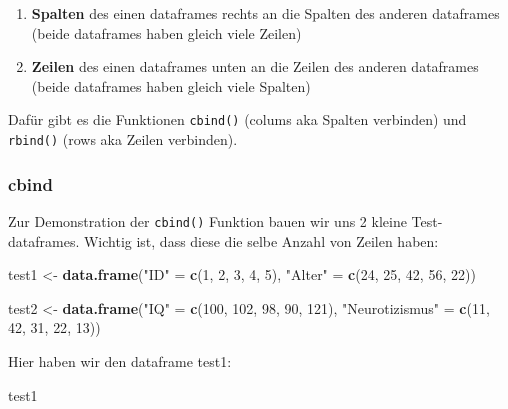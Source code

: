 \documentclass[
]{book}
\newenvironment{Shaded}{\begin{snugshade}}{\end{snugshade}}
\newcommand{\DecValTok}[1]{\textcolor[rgb]{0.00,0.00,0.81}{#1}}
\newcommand{\FunctionTok}[1]{\textcolor[rgb]{0.13,0.29,0.53}{\textbf{#1}}}
\newcommand{\NormalTok}[1]{#1}
\newcommand{\OtherTok}[1]{\textcolor[rgb]{0.56,0.35,0.01}{#1}}
\newcommand{\StringTok}[1]{\textcolor[rgb]{0.31,0.60,0.02}{#1}}
\providecommand{\tightlist}{%
  \setlength{\itemsep}{0pt}\setlength{\parskip}{0pt}}
\begin{document}
\begin{enumerate}
\def\labelenumi{\arabic{enumi}.}
\tightlist
\item
  \textbf{Spalten} des einen dataframes rechts an die Spalten des anderen dataframes (beide dataframes haben gleich viele Zeilen)
\item
  \textbf{Zeilen} des einen dataframes unten an die Zeilen des anderen dataframes (beide dataframes haben gleich viele Spalten)
\end{enumerate}

Dafür gibt es die Funktionen \texttt{cbind()} (colums aka Spalten verbinden) und \texttt{rbind()} (rows aka Zeilen verbinden).

\subsubsection{cbind}\label{cbind}

Zur Demonstration der \texttt{cbind()} Funktion bauen wir uns 2 kleine Test-dataframes. Wichtig ist, dass diese die selbe Anzahl von Zeilen haben:

\begin{Shaded}
\begin{Highlighting}[]
\NormalTok{test1 }\OtherTok{\textless{}{-}} \FunctionTok{data.frame}\NormalTok{(}\StringTok{"ID"} \OtherTok{=} \FunctionTok{c}\NormalTok{(}\DecValTok{1}\NormalTok{, }\DecValTok{2}\NormalTok{, }\DecValTok{3}\NormalTok{, }\DecValTok{4}\NormalTok{, }\DecValTok{5}\NormalTok{),}
                     \StringTok{"Alter"} \OtherTok{=} \FunctionTok{c}\NormalTok{(}\DecValTok{24}\NormalTok{, }\DecValTok{25}\NormalTok{, }\DecValTok{42}\NormalTok{, }\DecValTok{56}\NormalTok{, }\DecValTok{22}\NormalTok{))}

\NormalTok{test2 }\OtherTok{\textless{}{-}} \FunctionTok{data.frame}\NormalTok{(}\StringTok{"IQ"} \OtherTok{=} \FunctionTok{c}\NormalTok{(}\DecValTok{100}\NormalTok{, }\DecValTok{102}\NormalTok{, }\DecValTok{98}\NormalTok{, }\DecValTok{90}\NormalTok{, }\DecValTok{121}\NormalTok{),}
                     \StringTok{"Neurotizismus"} \OtherTok{=} \FunctionTok{c}\NormalTok{(}\DecValTok{11}\NormalTok{, }\DecValTok{42}\NormalTok{, }\DecValTok{31}\NormalTok{, }\DecValTok{22}\NormalTok{, }\DecValTok{13}\NormalTok{))}
\end{Highlighting}
\end{Shaded}

Hier haben wir den dataframe test1:

\begin{Shaded}
\begin{Highlighting}[]
\NormalTok{test1}
\end{Highlighting}
\end{Shaded}
\end{document}
